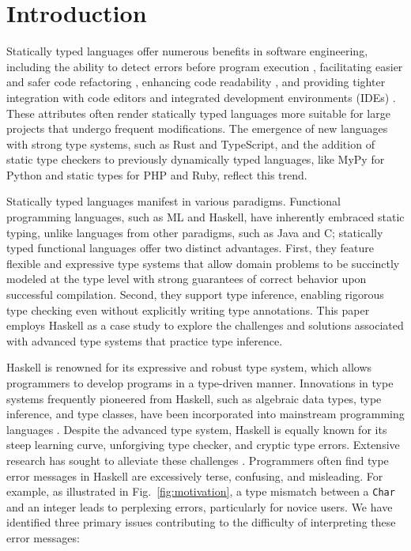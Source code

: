 \documentclass[pdflatex,lineno,sn-nature,Numbered]{sn-jnl}%
\begin{document}
\section{Introduction} \label{sec:introduction}

Statically typed languages offer numerous benefits in software engineering, including the ability to detect errors before program execution \cite{Ray2017-gq,Gao2017-xn}, facilitating easier and safer code refactoring \cite{Kleinschmager2012-bg}, enhancing code readability \cite{Endrikat2014-uz}, and providing tighter integration with code editors and integrated development environments (IDEs) \cite{Mayer2012-ko}. These attributes often render statically typed languages more suitable for large projects that undergo frequent modifications. The emergence of new languages with strong type systems, such as Rust and TypeScript, and the addition of static type checkers to previously dynamically typed languages, like MyPy for Python and static types for PHP and Ruby, reflect this trend.

Statically typed languages manifest in various paradigms. Functional programming languages, such as ML and Haskell, have inherently embraced static typing, unlike languages from other paradigms, such as Java and C; statically typed functional languages offer two distinct advantages. First, they feature flexible and expressive type systems that allow domain problems to be succinctly modeled at the type level with strong guarantees of correct behavior upon successful compilation. Second, they support type inference, enabling rigorous type checking even without explicitly writing type annotations. This paper employs Haskell as a case study to explore the challenges and solutions associated with advanced type systems that practice type inference.

Haskell is renowned for its expressive and robust type system, which allows programmers to develop programs in a type-driven manner. Innovations in type systems frequently pioneered from Haskell, such as algebraic data types, type inference, and type classes, have been incorporated into mainstream programming languages \cite{Hudak2007-kn, TypeScriptTeam_undated-qk, Klabnik_undated-mp, Griesemer_undated-ff}. Despite the advanced type system, Haskell is equally known for its steep learning curve, unforgiving type checker, and cryptic type errors. Extensive research has sought to alleviate these challenges \cite{Tirronen2015-nr, Chen2014-dz, Heeren2003-kd, Zhang2015-xy, Lerner2007-mu, Zhang2017-tj}. Programmers often find type error messages in Haskell are excessively terse, confusing, and misleading. For example, as illustrated in Fig.~\ref{fig:motivation}, a type mismatch between a {\tt Char} and an integer leads to perplexing errors, particularly for novice users. We have identified three primary issues contributing to the difficulty of interpreting these error messages:
\end{document}
